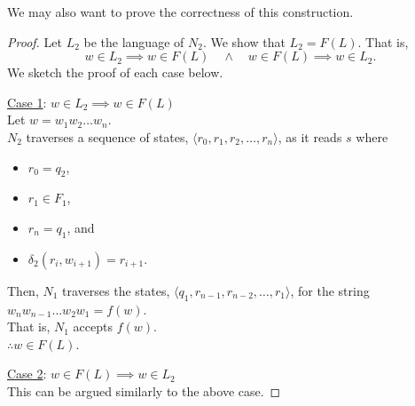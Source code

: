 \documentclass[a4paper]{exam}
\begin{document}
\begin{questions}
\begin{solution}
    We may also want to prove the correctness of this construction.
    \begin{proof}
      Let $L_2$ be the language of $N_2$. We show that $L_2 = F(L)$. That is,
      \[
        w\in L_2\implies w\in F(L)\quad \land\quad  w\in F(L)\implies w\in L_2.
      \]
      We sketch the proof of each case below.

      \underline{Case 1}: $w\in L_2\implies w\in F(L)$\\
      Let $w=w_1w_2\ldots w_n$.\\
      $N_2$ traverses a sequence of states, $\langle r_0,r_1,r_2,\ldots, r_n\rangle $, as it reads $s$ where
      \begin{itemize}
      \item $r_0 = q_2$,
      \item $r_1\in F_1$,
      \item $r_n = q_1$, and
      \item $\delta_2(r_i,w_{i+1}) = r_{i+1}$.
      \end{itemize}
      Then, $N_1$ traverses the states, $\langle q_1, r_{n-1}, r_{n-2}, \ldots, r_1\rangle$, for the string $w_nw_{n-1}\ldots w_2w_1= f(w)$.\\
      That is, $N_1$ accepts $f(w)$.\\
      $\therefore w\in F(L)$.
      
      \underline{Case 2}: $w\in F(L)\implies w\in L_2$\\
      This can be argued similarly to the above case.      
    \end{proof}
    
  \end{solution}
  
\end{questions}
\end{document}
